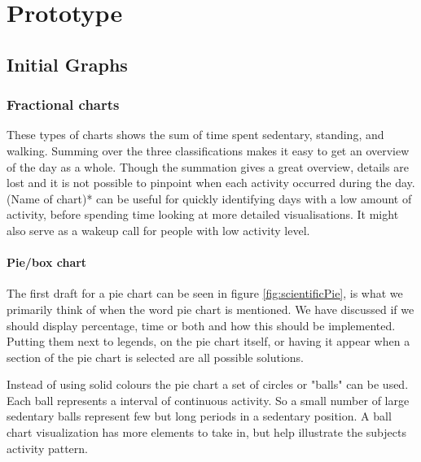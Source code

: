 \chapter{Prototype} %

\label{Chapter5} %


\section{Initial Graphs}

\subsection{Fractional charts}
These types of charts shows the sum of time spent sedentary, standing, and walking. Summing over the three classifications makes it easy to get an overview of the day as a whole. Though the summation gives a great overview, details are lost and it is not possible to pinpoint when each activity occurred during the day. (Name of chart)* can be useful for quickly identifying days with a low amount of activity, before spending time looking at more detailed visualisations. It might also serve as a wakeup call for people with low activity level.

\subsubsection{Pie/box chart}
The first draft for a pie chart can be seen in figure \ref{fig:scientificPie}, is what we primarily think of when the word pie chart is mentioned. We have discussed if we should display percentage, time or both and how this should be implemented. Putting them next to legends, on the pie chart itself, or having it appear when a section of the pie chart is selected are all possible solutions.

Instead of using solid colours the pie chart a set of circles or "balls" can be used. Each ball represents a interval of continuous activity. So a small number of large sedentary balls represent few but long periods in a sedentary position. A ball chart visualization has more elements to take in, but help illustrate the subjects activity pattern.


